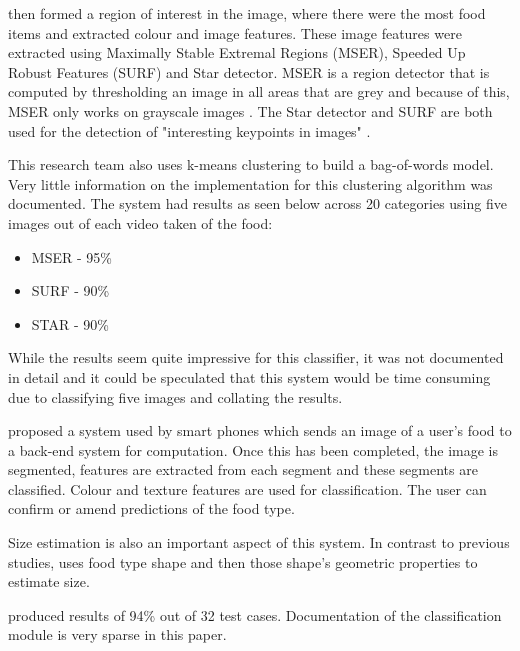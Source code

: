 \parencite{chen2010toward} then formed a region of interest in the image, where there were the most food items and extracted colour and image features.
These image features were extracted using Maximally Stable Extremal Regions (MSER), Speeded Up Robust Features (SURF) and Star detector.
MSER is a region detector that is computed by thresholding an image in all areas that are grey and because of this, MSER only works on grayscale images \parencite{sift}.
The Star detector and SURF are both used for the detection of "interesting keypoints in images" \parencite{chen2010toward}.

This research team also uses k-means clustering to build a bag-of-words model.
Very little information on the implementation for this clustering algorithm was documented.
The system had results as seen below across 20 categories using five images out of each video taken of the food:
\begin{itemize}
	\item{MSER - 95\%}
	\item{SURF - 90\%}
	\item{STAR - 90\%}
\end{itemize}
While the results seem quite impressive for this classifier, it was not documented in detail and it could be speculated that this system would be time consuming due to classifying five images and collating the results.




\parencite{schap2014merging} proposed a system used by smart phones which sends an image of a user's food to a back-end system for computation.
Once this has been completed, the image is segmented, features are extracted from each segment and these segments are classified.
Colour and texture features are used for classification.
The user can confirm or amend predictions of the food type.

Size estimation is also an important aspect of this system.
In contrast to previous studies, \parencite{snap} uses food type shape and then those shape's geometric properties to estimate size.

\parencite{schap2014merging} produced results of 94\% out of 32 test cases.
Documentation of the classification module is very sparse in this paper.
